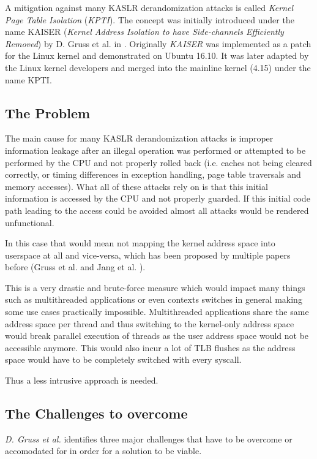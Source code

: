 A mitigation against many KASLR derandomization attacks is called \textit{Kernel Page Table Isolation} (\textit{KPTI}).
The concept was initially introduced under the name KAISER (\textit{Kernel Address Isolation to have Side-channels Efficiently Removed}) by D. Gruss et al. in \cite{kaiser}.
Originally \textit{KAISER} was implemented as a patch for the Linux kernel and demonstrated on Ubuntu 16.10.
It was later adapted by the Linux kernel developers and merged into the mainline kernel (4.15) under the name KPTI.

\subsection{The Problem}

The main cause for many KASLR derandomization attacks is improper information leakage after an illegal operation was performed or attempted to be performed by the CPU and not properly rolled back (i.e. caches not being cleared correctly, or timing differences in exception handling, page table traversals and memory accesses).
What all of these attacks rely on is that this initial information is accessed by the CPU and not properly guarded.
If this initial code path leading to the access could be avoided almost all attacks would be rendered unfunctional. \cite{kaiser}

In this case that would mean not mapping the kernel address space into userspace at all and vice-versa, which has been proposed by multiple papers before (Gruss et al. \cite{prefetch-side-channel-smap} and Jang et al. \cite{drk}).

This is a very drastic and brute-force measure which would impact many things such as multithreaded applications or even contexts switches in general making some use cases practically impossible.
Multithreaded applications share the same address space per thread and thus switching to the kernel-only address space would break parallel execution of threads as the user address space would not be accessible anymore.
This would also incur a lot of TLB flushes as the address space would have to be completely switched with every syscall.\cite{kaiser}

Thus a less intrusive approach is needed.

\subsection{The Challenges to overcome}

\textit{D. Gruss et al.} \cite{kaiser} identifies three major challenges that have to be overcome or accomodated for in order for a solution to be viable.

